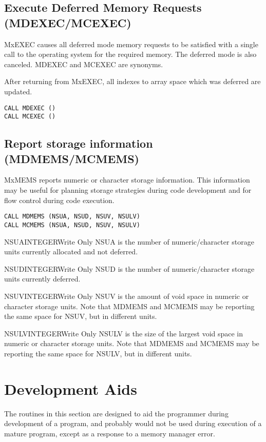 \subsection{Execute Deferred Memory Requests (MDEXEC/MCEXEC)}
MxEXEC causes all deferred mode memory requests to be satisfied
with a single call to the operating system for the required memory. The
deferred mode is also canceled. MDEXEC and MCEXEC are synonyms.

After returning from MxEXEC, all indexes to array space which was
deferred are updated.
\begin{verbatim}
CALL MDEXEC ()
CALL MCEXEC ()
\end{verbatim}

\subsection{Report storage information (MDMEMS/MCMEMS)}
MxMEMS reports numeric or character storage information. This information
may be useful for planning storage strategies during code development
and for flow control during code execution.
\begin{verbatim}
CALL MDMEMS (NSUA, NSUD, NSUV, NSULV)
CALL MCMEMS (NSUA, NSUD, NSUV, NSULV)
\end{verbatim}

\begin{argy}{NSUA}{INTEGER}{Write Only}
NSUA is the number of numeric/character storage units currently allocated
and not deferred.
\end{argy}

\begin{argy}{NSUD}{INTEGER}{Write Only}
NSUD is the number of numeric/character storage units currently deferred.
\end{argy}

\begin{argy}{NSUV}{INTEGER}{Write Only}
NSUV is the amount of void space in numeric or character storage units. Note
that MDMEMS and MCMEMS may be reporting the same space for NSUV, but in
different units.
\end{argy}

\begin{argy}{NSULV}{INTEGER}{Write Only} 
NSULV is the size of the largest void space in numeric or character storage
units. Note that MDMEMS and MCMEMS may be reporting the same space for
NSULV, but in different units. 
\end{argy} 

\section{Development Aids}\label{sec:mdev}
The routines in this section are designed to aid the programmer during
development of a program, and probably would not be used during execution of
a mature program, except as a response to a memory manager error.

